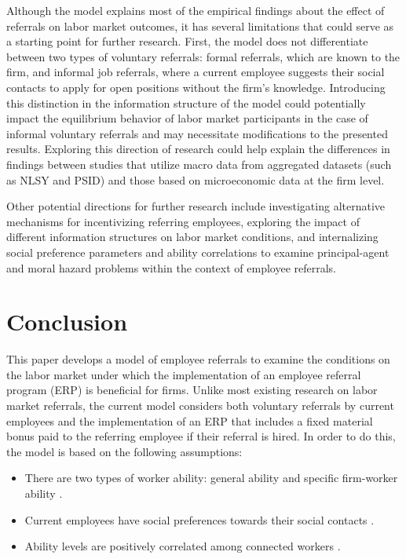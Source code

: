 \documentclass[12pt]{article}
\begin{document}
Although the model explains most of the empirical findings about the effect of referrals on labor market outcomes, it has several limitations that could serve as a starting point for further research. First, the model does not differentiate between two types of voluntary referrals: formal referrals, which are known to the firm, and informal job referrals, where a current employee suggests their social contacts to apply for open positions without the firm's knowledge. Introducing this distinction in the information structure of the model could potentially impact the equilibrium behavior of labor market participants in the case of informal voluntary referrals and may necessitate modifications to the presented results. Exploring this direction of research could help explain the differences in findings between studies that utilize macro data from aggregated datasets (such as NLSY and PSID) and those based on microeconomic data at the firm level. 

Other potential directions for further research include investigating alternative mechanisms for incentivizing referring employees, exploring the impact of different information structures on labor market conditions, and internalizing social preference parameters and ability correlations to examine principal-agent and moral hazard problems within the context of employee referrals.

\section{Conclusion} \label{sec:conclusion}

This paper develops a model of employee referrals to examine the conditions on the labor market under which the implementation of an employee referral program (ERP) is beneficial for firms. Unlike most existing research on labor market referrals, the current model considers both voluntary referrals by current employees and the implementation of an ERP that includes a fixed material bonus paid to the referring employee if their referral is hired. In order to do this, the model is based on the following assumptions:
\begin{itemize}
    \item There are two types of worker ability: general ability and specific firm-worker ability \citep{becker1962investment, becker1975investment, gibbons2004task, lazear2009firm}. 
    \item Current employees have social preferences towards their social contacts \citep{bandiera2009social, friebel2023employee}.
    \item Ability levels are positively correlated among connected workers \citep{montgomery1991social}.
\end{itemize}
\end{document}

